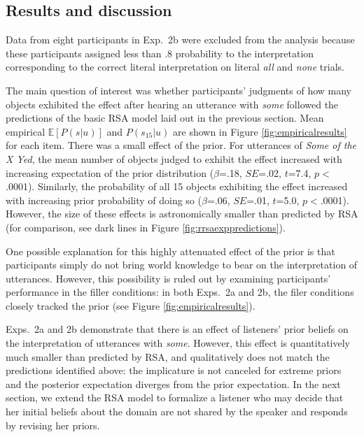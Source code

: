 \documentclass[10pt,letterpaper]{article}
\newcommand{\figref}[1]{Figure \ref{#1}}
\begin{document}
 
 \subsection{Results and discussion}

Data from eight participants in Exp.~2b were excluded from the analysis because these participants assigned less than .8 probability to the interpretation corresponding to the correct literal interpretation on literal \emph{all} and \emph{none} trials. 

The main question of interest was whether participants' judgments of how many objects exhibited the effect after hearing an utterance with \emph{some} followed the predictions of the basic RSA model laid out in the previous section. Mean empirical $\mathbb{E}[P(s|u)]$ and $P(s_{15}|u)$ are shown in \figref{fig:empiricalresults} for each item. There was a small effect of the prior. For utterances of \emph{Some of the X Yed}, the mean number of objects judged to exhibit the effect increased with increasing expectation of the prior distribution ($\beta$=.18, $SE$=.02, $t$=7.4, $p$$<$.0001). Similarly, the probability of all 15 objects exhibiting the effect increased with increasing prior probability of doing so ($\beta$=.06, $SE$=.01, $t$=5.0, $p$$<$.0001). However, the size of these effects is astronomically smaller than predicted by RSA (for comparison, see dark lines in \figref{fig:rrsaexppredictions}).%

One possible explanation for this highly attenuated effect of the prior is that participants simply do not bring world knowledge to bear on the interpretation of utterances. However, this possibility is ruled out by examining participants' performance in the filler conditions: in both Exps.~2a and 2b, the filer conditions closely tracked the prior (see \figref{fig:empiricalresults}). 

Exps.~2a and 2b demonstrate that there is an effect of listeners' prior beliefs on the interpretation of utterances with \emph{some}. However, this effect is quantitatively much smaller than predicted by RSA, and qualitatively does not match the predictions identified above: the implicature is not canceled for extreme priors and the posterior expectation diverges from the prior expectation.
In the next section, we extend the RSA model to formalize a listener who may decide that her initial beliefs about the domain are not shared by the speaker and responds by revising her priors.
\end{document}
